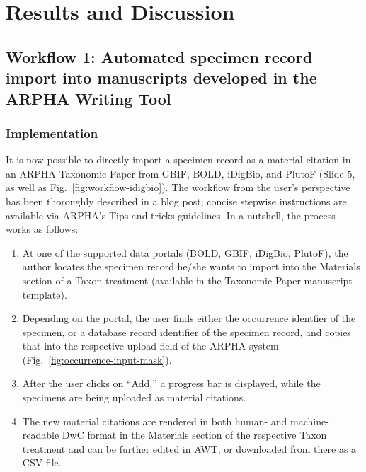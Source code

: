 \section{Results and Discussion}

\subsection{Workflow 1: Automated specimen record import into manuscripts developed in the ARPHA Writing Tool}

\subsubsection{Implementation}

It is now possible to directly import a specimen record as a material citation in an ARPHA Taxonomic Paper from GBIF, BOLD, iDigBio, and PlutoF (Slide 5, as well as Fig.~\ref{fig:workflow-idigbio}). The workflow from the user's perspective has been thoroughly described in a blog post; concise stepwise instructions are available via ARPHA's Tips and tricks guidelines. In a nutshell, the process works as follows:

\begin{enumerate}
\item{At one of the supported data portals (BOLD, GBIF, iDigBio, PlutoF), the author locates the specimen record he/she wants to import into the Materials section of a Taxon treatment (available in the Taxonomic Paper manuscript template).}
\item{Depending on the portal, the user finds either the occurrence identfier of the specimen, or a database record identifier of the specimen record, and copies that into the respective upload field of the ARPHA system (Fig.~\ref{fig:occurrence-input-mask}).}
\item{After the user clicks on ``Add,'' a progress bar is displayed, while the specimens are being uploaded as material citations.}
\item{The new material citations are rendered in both human- and machine-readable DwC format in the Materials section of the respective Taxon treatment and can be further edited in AWT, or downloaded from there as a CSV file.}
\end{enumerate}

